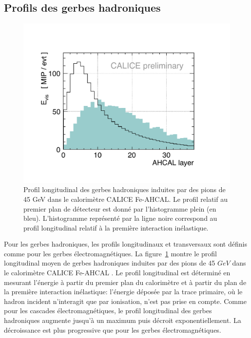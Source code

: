 \subsection{Profils des gerbes hadroniques}
\begin{figure}[!h]
  \begin{center}
    \includegraphics[width=.7\textwidth]{ShowerTh/figs/fig_7a_lp.pdf}
    \caption{Profil longitudinal des gerbes hadroniques induites par des pions de 45 GeV dans le calorimètre CALICE Fe-AHCAL. Le profil relatif au premier plan de détecteur est donné par l'histogramme plein (en bleu). L'histogramme représenté par la ligne noire correspond au profil longitudinal relatif à la première interaction inélastique.}
    \label{fig:lProfil_pi-}
  \end{center}
\end{figure}
Pour les gerbes hadroniques, les profils longitudinaux et transversaux sont définis comme pour les gerbes électromagnétiques. La figure~\ref{fig:lProfil_pi-} montre le profil longitudinal moyen de gerbes hadroniques induites par des pions de 45 $GeV$ dans le calorimètre CALICE Fe-AHCAL \cite{ahcal_pi-_profil}. Le profil longitudinal est déterminé en mesurant l'énergie à partir du premier plan du calorimètre et à partir du plan de la première interaction inélastique: l'énergie déposée par la trace primaire, où le hadron incident n'interagit que par ionisation, n'est pas prise en compte. Comme pour les cascades électromagnétiques, le profil longitudinal des gerbes hadroniques augmente jusqu'à un maximum puis décroit exponentiellement. La décroissance est plus progressive que pour les gerbes électromagnétiques. 

